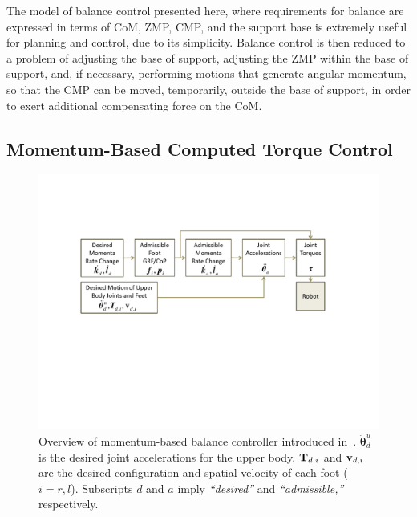 \documentclass{llncs}
\newcommand {\mat}[1] {{\bf #1}}
\newcommand{\mT} {\mat{T}}
\newcommand{\vddth} {\boldsymbol{\ddot{\theta}}}
\newcommand{\sv} {{\bf v}} %
\begin{document}
The model of balance control presented here, where requirements for balance are expressed in terms of CoM, ZMP, CMP, and the support base 
is extremely useful for planning and control, due to its simplicity.  
Balance control is then reduced to a problem of adjusting the base of support, adjusting the ZMP within the base of support, and, if necessary, performing motions 
that generate angular momentum, so that the CMP can be moved, temporarily, outside the base of support, in order to exert additional compensating force on the CoM.












\subsection{Momentum-Based Computed Torque Control }
\label{sec:framework}


\begin{figure}[h]
\begin{center}
\includegraphics[width = 0.7\columnwidth]{Figures/diagram-short.pdf}
\end{center}
\caption{Overview of momentum-based balance controller introduced in~\cite{LG12}.
$\vddth_d^u$ is the desired joint accelerations for the upper body.
$\mT_{d,i}$ and $\sv_{d,i}$ are the desired configuration
and spatial velocity of each foot ($i = r, l$). Subscripts $d$ and $a$ imply {\em ``desired''} and {\em ``admissible,''} respectively. }
\label{fig:overview}
\end{figure}
\end{document}
